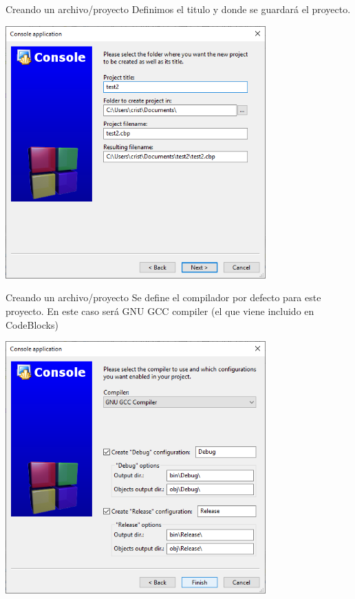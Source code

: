 \documentclass[11pt]{beamer}
\begin{document}
\begin{frame}{Creando un archivo/proyecto}
    \justifying
    Definimos el titulo y donde se guardará el proyecto.
    
    \centering
    \includegraphics[width=0.75\textwidth]{cb28_1.png}
\end{frame}
\begin{frame}{Creando un archivo/proyecto}
    \justifying
    Se define el compilador por defecto para este proyecto. En este caso será GNU GCC compiler (el que viene incluido en CodeBlocks)
    
    \centering
    \includegraphics[width=0.75\textwidth]{cb29_1.png}
\end{frame}
\end{document}
